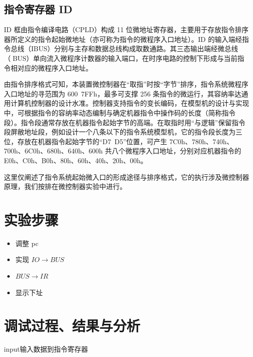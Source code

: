 \documentclass[a4paper,10pt,UTF8]{paper}
\numberwithin{equation}{section}
\numberwithin{figure}{section}
\begin{document}
\subsection{指令寄存器 ID}

ID 框由指令编译电路（CPLD）构成 11 位微地址寄存器，主要用于存放指令排序器所定义的指令起始微地址（亦可称为指令的微程序入口地址）。ID 的输入端经指令总线（IBUS）分别与主存和数据总线构成取数通路。其三态输出端经微总线（BUS）单向流入微程序计数器的输入端口，在时序电路的控制下形成与当前指令相对应的微程序入口地址。

由指令排序格式可知，本装置微控制器在“取指”时按“字节”排序，指令系统微程序入口地址的寻范围为 600~7FFh，最多可支撑 256 条指令的微运行，其容纳率达通用计算机控制器的设计水准。控制器支持指令的变长编码，在模型机的设计与实现中，可根据指令的容纳率动态编制与确定机器指令中操作码的长度（简称指令段）。指令段通常存放在机器指令起始字节的高端。在取指时用“与逻辑”保留指令段屏敝地址段，例如设计一个八条以下的指令系统模型机，它的指令段长度为三位，存放在机器指令起始字节的“D7~D5”位置，可产生 7C0h、780h、740h、700h、6C0h、680h、640h、600h 共八个微程序入口地址，分别对应机器指令的 E0h、C0h、B0h、80h、60h、40h、20h、00h。


这里仅阐述了指令系统起始微入口的形成途径与排序格式，它的执行涉及微控制器原理，我们按排在微控制器实验中进行。



\section{实验步骤}

\begin{itemize}
  \item 调整 pc
  \item 实现 $IO \rightarrow BUS$
  \item $BUS \rightarrow IR$
  \item 显示下址
\end{itemize}

\section{调试过程、结果与分析}

input输入数据到指令寄存器
\end{document}
